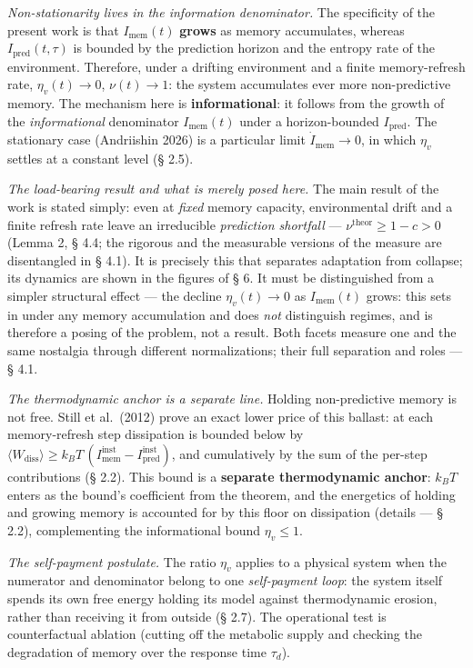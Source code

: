 \documentclass[pdflatex,sn-mathphys-ay]{sn-jnl}
\begin{document}
\emph{Non-stationarity lives in the information denominator.} The specificity of the present work is that \(I_{\text{mem}}(t)\) \textbf{grows} as memory accumulates, whereas \(I_{\text{pred}}(t,\tau)\) is bounded by the prediction horizon and the entropy rate of the environment. Therefore, under a drifting environment and a finite memory-refresh rate, \(\eta_v(t) \to 0\), \(\nu(t) \to 1\): the system accumulates ever more non-predictive memory. The mechanism here is \textbf{informational}: it follows from the growth of the \emph{informational} denominator \(I_{\text{mem}}(t)\) under a horizon-bounded \(I_{\text{pred}}\). The stationary case (Andriishin 2026) is a particular limit \(\dot I_{\text{mem}} \to 0\), in which \(\eta_v\) settles at a constant level (§ 2.5).



\emph{The load-bearing result and what is merely posed here.} The main result of the work is stated simply: even at \emph{fixed} memory capacity, environmental drift and a finite refresh rate leave an irreducible \emph{prediction shortfall} --- \(\nu^{\text{theor}} \ge 1 - c > 0\) (Lemma 2, § 4.4; the rigorous and the measurable versions of the measure are disentangled in § 4.1). It is precisely this that separates adaptation from collapse; its dynamics are shown in the figures of § 6. It must be distinguished from a simpler structural effect --- the decline \(\eta_v(t) \to 0\) as \(I_{\text{mem}}(t)\) grows: this sets in under any memory accumulation and does \emph{not} distinguish regimes, and is therefore a posing of the problem, not a result. Both facets measure one and the same nostalgia through different normalizations; their full separation and roles --- § 4.1.



\emph{The thermodynamic anchor is a separate line.} Holding non-predictive memory is not free. Still et al.~(2012) prove an exact lower price of this ballast: at each memory-refresh step dissipation is bounded below by \(\langle W_{\text{diss}}\rangle \ge k_B T\,(I_{\text{mem}}^{\text{inst}} - I_{\text{pred}}^{\text{inst}})\), and cumulatively by the sum of the per-step contributions (§ 2.2). This bound is a \textbf{separate thermodynamic anchor}: \(k_B T\) enters as the bound's coefficient from the theorem, and the energetics of holding and growing memory is accounted for by this floor on dissipation (details --- § 2.2), complementing the informational bound \(\eta_v \le 1\).



\emph{The self-payment postulate.} The ratio \(\eta_v\) applies to a physical system when the numerator and denominator belong to one \emph{self-payment loop}: the system itself spends its own free energy holding its model against thermodynamic erosion, rather than receiving it from outside (§ 2.7). The operational test is counterfactual ablation (cutting off the metabolic supply and checking the degradation of memory over the response time \(\tau_d\)).
\end{document}

